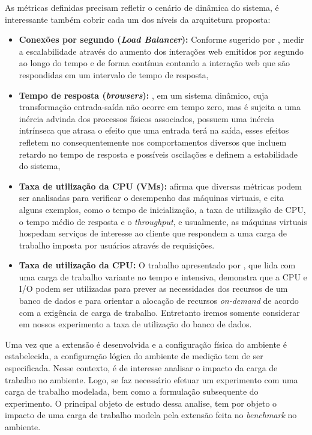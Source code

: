 As métricas definidas precisam refletir o cenário de dinâmica do sistema, é interessante também cobrir cada um dos níveis da arquitetura proposta:
\begin{itemize}
	\item \textbf{Conexões por segundo (\textit{Load Balancer}):} Conforme sugerido por , medir a escalabilidade através do aumento dos interações web emitidos por segundo ao longo do tempo e de forma contínua contando a interação web que são respondidas em um intervalo de tempo de resposta,
	
	\item \textbf{Tempo de resposta (\textit{browsers}):} , em um sistema dinâmico, cuja transformação entrada-saída não ocorre em tempo zero, mas é sujeita a uma inércia advinda dos processos físicos associados, possuem uma inércia intrínseca que atrasa o efeito que uma entrada terá na saída, esses efeitos refletem no consequentemente nos comportamentos diversos que incluem retardo no tempo de resposta e possíveis oscilações e definem a estabilidade do sistema, 
	
	\item \textbf{Taxa de utilização da CPU (VMs):}  afirma que diversas métricas podem ser analisadas para verificar o desempenho das máquinas virtuais, e cita alguns exemplos, como o tempo de inicialização, a taxa de utilização de CPU, o tempo médio de resposta e o \textit{throughput}, e usualmente, as máquinas virtuais hospedam serviços de interesse ao cliente que respondem a uma carga de trabalho imposta por usuários através de requisições.

	\item \textbf{Taxa de utilização da CPU:} O trabalho apresentado por , que lida com uma carga de trabalho variante no tempo e intensiva, demonstra que a CPU e I/O podem ser utilizadas para prever as necessidades dos recursos de um banco de dados e para orientar a alocação de recursos \textit{on-demand} de acordo com a exigência de carga de trabalho. Entretanto iremos somente considerar em nossos experimento a taxa de utilização do banco de dados.
\end{itemize}


Uma vez que a extensão é desenvolvida e a configuração física do ambiente é estabelecida, a configuração lógica do ambiente de medição tem de ser especificada. Nesse contexto, é de interesse analisar o impacto da carga de trabalho no ambiente. Logo, se faz necessário efetuar um experimento com uma carga de trabalho modelada, bem como a formulação subsequente do experimento. 
O principal objeto de estudo dessa analise, tem por objeto o impacto de uma carga de trabalho modela pela extensão feita no \textit{benchmark} no ambiente.

